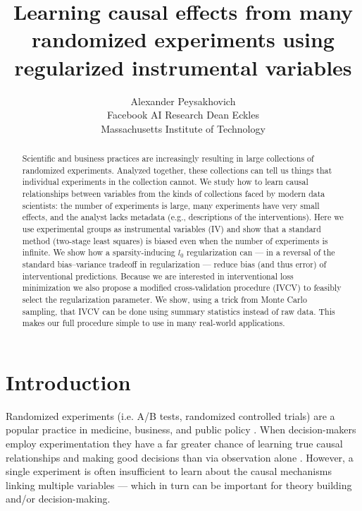 \documentclass{article}
\title{Learning causal effects from many randomized experiments using regularized instrumental variables}
\author{
Alexander Peysakhovich\\
Facebook AI Research
\And
Dean Eckles \\
Massachusetts Institute of Technology\\
}
\begin{document}

\maketitle

\begin{abstract}
Scientific and business practices are increasingly resulting in large collections of randomized experiments. Analyzed together, these collections can tell us things that individual experiments in the collection cannot. We study how to learn causal relationships between variables from the kinds of collections faced by modern data scientists: the number of experiments is large, many experiments have very small effects, and the analyst lacks metadata (e.g., descriptions of the interventions). Here we use experimental groups as instrumental variables (IV) and show that a standard method (two-stage least squares) is biased even when the number of experiments is infinite. We show how a sparsity-inducing $l_0$ regularization can --- in a reversal of the standard bias--variance tradeoff in regularization --- reduce bias (and thus error) of interventional predictions. Because we are interested in interventional loss minimization we also propose a modified cross-validation procedure (IVCV) to feasibly select the regularization parameter. We show, using a trick from Monte Carlo sampling, that IVCV can be done using summary statistics instead of raw data. This makes our full procedure simple to use in many real-world applications.
\end{abstract}

\section{Introduction}
Randomized experiments (i.e. A/B tests, randomized controlled trials) are a popular practice in medicine, business, and public policy \citep{banerjee2012poor, kohavi2013online}. When decision-makers employ experimentation they have a far greater chance of learning true causal relationships and making good decisions than via observation alone \citep{lalonde1986evaluating, meyer2015two, hemkens2016agreement}. However, a single experiment is often insufficient to learn about the causal mechanisms linking multiple variables --- which in turn can be important for theory building and/or decision-making.
\end{document}
